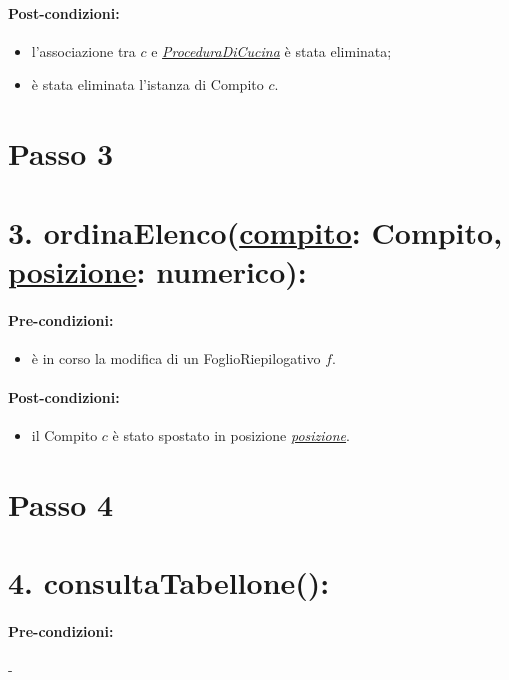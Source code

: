 \paragraph{Post-condizioni:}

\begin{itemize}
    \item l'associazione tra $c$ e \underline{\textit{ProceduraDiCucina}} è stata eliminata;
    \item è stata eliminata l'istanza di Compito $c$.
\end{itemize}

\section{Passo 3}

\section*{3. ordinaElenco(\underline{compito}: Compito, \underline{posizione}: numerico):}

\paragraph{Pre-condizioni:}

\begin{itemize}
    \item è in corso la modifica di un FoglioRiepilogativo $f$.
\end{itemize}

\paragraph{Post-condizioni:}

\begin{itemize}
    \item il Compito $c$ è stato spostato in posizione \underline{\textit{posizione}}.
\end{itemize}

\section{Passo 4}

\section*{4. consultaTabellone():}

\paragraph{Pre-condizioni:} -

